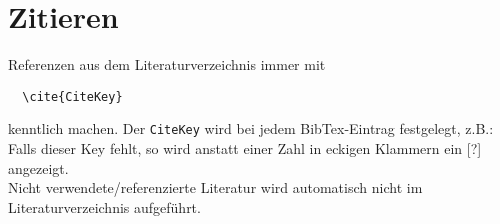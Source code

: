 \chapter{Zitieren}

Referenzen aus dem Literaturverzeichnis immer mit

\begin{verbatim}
  \cite{CiteKey} 
\end{verbatim}

kenntlich machen. Der \texttt{CiteKey} wird bei jedem BibTex-Eintrag festgelegt, z.B.: \cite{Welsh:2001:SAW:502034.502057}\\
Falls dieser Key fehlt, so wird anstatt einer Zahl in eckigen Klammern ein [?] angezeigt.\\
Nicht verwendete/referenzierte Literatur wird automatisch nicht im Literaturverzeichnis aufgeführt.